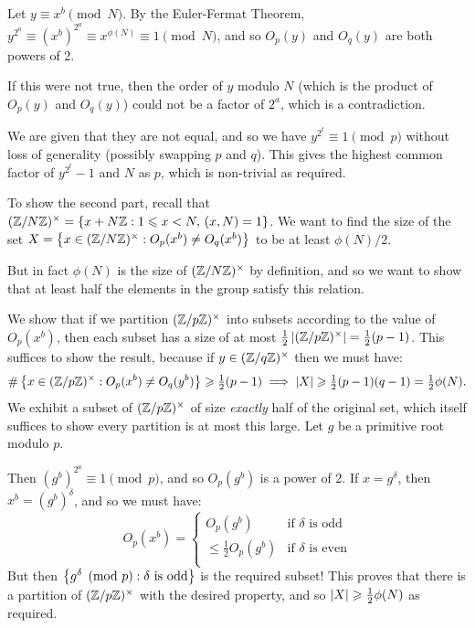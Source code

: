 \documentclass{article}
\begin{document}
\begin{prf}
    Let $y \equiv x^b \pmod N$. By the Euler-Fermat Theorem, $y^{2^a} \equiv (x^b)^{2^a} \equiv x^{\phi(N)} \equiv 1 \pmod N$, and so $O_p(y)$ and $O_q(y)$ are both powers of 2.
    
    If this were not true, then the order of $y$ modulo $N$ (which is the product of $O_p(y)$ and $O_q(y)$) could not be a factor of $2^a$, which is a contradiction.
    
    We are given that they are not equal, and so we have $y^{2^t} \equiv 1 \pmod p$ without loss of generality (possibly swapping $p$ and $q$). This gives the highest common factor of $y^{2^t}-1$ and $N$ as $p$, which is non-trivial as required.
    
    To show the second part, recall that $(\mathbb{Z}/N\mathbb{Z})^\times = \left\lbrace x + N\mathbb{Z} : 1 \leqslant x < N, \, (x, N) = 1 \right\rbrace$. We want to find the size of the set $X = \left\lbrace x \in (\mathbb{Z}/N\mathbb{Z})^\times : O_p(x^b) \neq O_q(x^b) \right\rbrace$ to be at least $\phi(N)/2$.
    
    But in fact $\phi(N)$ is the size of $(\mathbb{Z}/N\mathbb{Z})^\times$ by definition, and so we want to show that at least half the elements in the group satisfy this relation.
    
    We show that if we partition $(\mathbb{Z}/p\mathbb{Z})^\times$ into subsets according to the value of $O_p(x^b)$, then each subset has a size of at most $\tfrac{1}{2} \left\lvert (\mathbb{Z}/p\mathbb{Z})^\times \right\rvert = \tfrac{1}{2}(p-1)$. This suffices to show the result, because if $y \in (\mathbb{Z}/q\mathbb{Z})^\times$ then we must have:
    \[
	\# \left\lbrace x \in (\mathbb{Z}/p\mathbb{Z})^\times : O_p(x^b) \neq O_q(y^b) \right\rbrace \geqslant \tfrac{1}{2} (p-1)
	\implies \left\lvert X \right\rvert \geqslant \tfrac{1}{2}(p-1)(q-1) = \tfrac{1}{2}\phi(N).
	\]
	We exhibit a subset of $(\mathbb{Z}/p\mathbb{Z})^\times$ of size \textit{exactly} half of the original set, which itself suffices to show every partition is at most this large.
	Let $g$ be a primitive root modulo $p$.
	
	Then $(g^b)^{2^a} \equiv 1 \pmod p$, and so $O_p(g^b)$ is a power of 2. If $x = g^\delta$, then $x^b = (g^b)^\delta$, and so we must have:
	\[
	O_p(x^b) = \begin{cases}
		O_p(g^b) & \text{if $\delta$ is odd} \\
		\leq \tfrac{1}{2} O_p(g^b) & \text{if $\delta$ is even} \\
	\end{cases}
	\]
	But then $\left\lbrace g^\delta \pmod p : \delta \text{ is odd} \right\rbrace$ is the required subset! This proves that there is a partition of $(\mathbb{Z}/p\mathbb{Z})^\times$ with the desired property, and so $\left\lvert X \right\rvert \geqslant \tfrac{1}{2} \phi(N)$ as required.
\end{prf}
\end{document}
